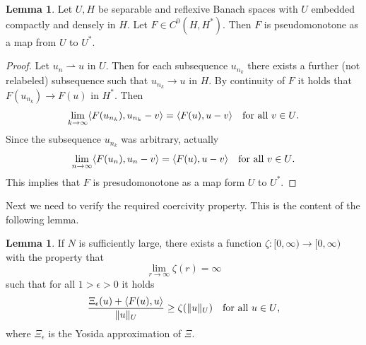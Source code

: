 \documentclass[a4paper,10pt,twoside]{amsbook}
\numberwithin{section}{chapter}
\numberwithin{equation}{chapter}
\theoremstyle{definition}
\newtheorem{lemma}[prop]{Lemma}
\DeclarePairedDelimiter{\norm}{\lVert}{\rVert}
\DeclarePairedDelimiter{\dual}{\langle}{\rangle}
\begin{document}
\begin{lemma}
Let $U,H$ be separable and reflexive Banach spaces with $U$ embedded compactly and densely in $H$. Let $F\in C^0(H,H^*)$. Then $F$ is pseudomonotone as a map from $U$ to $U^*$.
\end{lemma}
\begin{proof}
Let $u_n\rightharpoonup u$ in $U$. Then for each subsequence $u_{n_k}$ there exists a further (not relabeled) subsequence such that $u_{n_k}\to u$ in $H$. By continuity of $F$ it holds that $F(u_{n_k})\to F(u)$ in $H^*$. Then
\[
\lim_{k\to\infty}\dual{F(u_{n_k}),u_{n_k}-v}=\dual{F(u),u-v}\quad\text{for all $v\in U$}.
\]
Since the subsequence $u_{n_k}$ was arbitrary, actually
\[
\lim_{n\to\infty}\dual{F(u_{n}),u_{n}-v}=\dual{F(u),u-v}\quad\text{for all $v\in U$}.
\]
This implies that $F$ is presudomonotone as a map form $U$ to $U^*$.
\end{proof}
Next we need to verify the required coercivity property. This is the content of the following lemma.
\begin{lemma}
If $N$ is sufficiently large, there exists a function $\zeta\colon[0,\infty)\to[0,\infty)$ with the property that
\[
\lim_{r\to\infty}\zeta(r)=\infty
\]
such that for all $1>\epsilon>0$ it holds
\[
\frac{\Xi_\epsilon(u)+\dual{F(u),u}}{\norm{u}_U}\ge\zeta(\norm{u}_U)\quad\text{for all $u\in U$,}
\]
where $\Xi_\epsilon$ is the Yosida approximation of $\Xi$.
\end{lemma}
\end{document}
